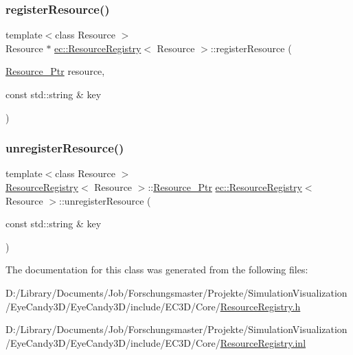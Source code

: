 \subsubsection{\texorpdfstring{register\+Resource()}{registerResource()}}
{\footnotesize\ttfamily template$<$class Resource $>$ \\
Resource $\ast$ \mbox{\hyperlink{classec_1_1_resource_registry}{ec\+::\+Resource\+Registry}}$<$ Resource $>$\+::register\+Resource (\begin{DoxyParamCaption}\item[{\mbox{\hyperlink{classec_1_1_resource_registry_a77cf5381229bff47d251603c783115fe}{Resource\+\_\+\+Ptr}}}]{resource,  }\item[{const std\+::string \&}]{key }\end{DoxyParamCaption})}

\mbox{\label{classec_1_1_resource_registry_ae1227f72ea04032d4e757ac4b5b0845a}} 
\subsubsection{\texorpdfstring{unregister\+Resource()}{unregisterResource()}}
{\footnotesize\ttfamily template$<$class Resource $>$ \\
\mbox{\hyperlink{classec_1_1_resource_registry}{Resource\+Registry}}$<$ Resource $>$\+::\mbox{\hyperlink{classec_1_1_resource_registry_a77cf5381229bff47d251603c783115fe}{Resource\+\_\+\+Ptr}} \mbox{\hyperlink{classec_1_1_resource_registry}{ec\+::\+Resource\+Registry}}$<$ Resource $>$\+::unregister\+Resource (\begin{DoxyParamCaption}\item[{const std\+::string \&}]{key }\end{DoxyParamCaption})}



The documentation for this class was generated from the following files\+:\begin{DoxyCompactItemize}
\item 
D\+:/\+Library/\+Documents/\+Job/\+Forschungsmaster/\+Projekte/\+Simulation\+Visualization/\+Eye\+Candy3\+D/\+Eye\+Candy3\+D/include/\+E\+C3\+D/\+Core/\mbox{\hyperlink{_resource_registry_8h}{Resource\+Registry.\+h}}\item 
D\+:/\+Library/\+Documents/\+Job/\+Forschungsmaster/\+Projekte/\+Simulation\+Visualization/\+Eye\+Candy3\+D/\+Eye\+Candy3\+D/include/\+E\+C3\+D/\+Core/\mbox{\hyperlink{_resource_registry_8inl}{Resource\+Registry.\+inl}}\end{DoxyCompactItemize}
